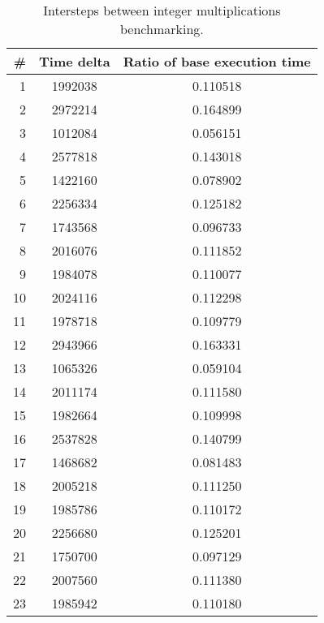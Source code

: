 \begin{table}
\centering
\begin{tabular}{rcc}
\# & Time delta & Ratio of base execution time\\
\hline
1 & 1992038 & 0.110518 \\
2 & 2972214 & 0.164899 \\
3 & 1012084 & 0.056151 \\
4 & 2577818 & 0.143018 \\
5 & 1422160 & 0.078902 \\
6 & 2256334 & 0.125182 \\
7 & 1743568 & 0.096733 \\
8 & 2016076 & 0.111852 \\
9 & 1984078 & 0.110077 \\
10 & 2024116 & 0.112298 \\
11 & 1978718 & 0.109779 \\
12 & 2943966 & 0.163331 \\
13 & 1065326 & 0.059104 \\
14 & 2011174 & 0.111580 \\
15 & 1982664 & 0.109998 \\
16 & 2537828 & 0.140799 \\
17 & 1468682 & 0.081483 \\
18 & 2005218 & 0.111250 \\
19 & 1985786 & 0.110172 \\
20 & 2256680 & 0.125201 \\
21 & 1750700 & 0.097129 \\
22 & 2007560 & 0.111380 \\
23 & 1985942 & 0.110180 \\
\end{tabular}
\captionsetup{justification=centering}
\caption{Intersteps between integer multiplications benchmarking.}
\end{table}

